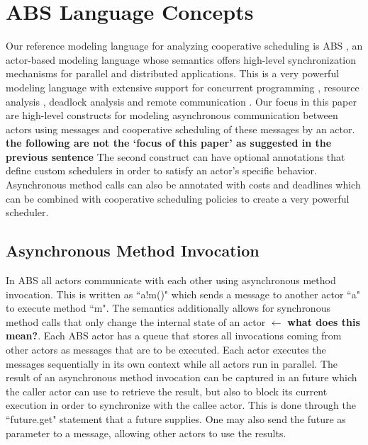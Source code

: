 

\section{ABS Language Concepts}
\label{lang}
Our reference modeling language for analyzing cooperative scheduling is ABS \cite{abs}, an actor-based modeling language whose semantics offers high-level synchronization mechanisms for parallel and  distributed applications. This is a very powerful modeling language with extensive support for concurrent programming \cite{cog}, resource analysis \cite{saco}, deadlock analysis \cite{dead} and remote communication \cite{dis,cloud}. Our focus in this paper are  high-level constructs for modeling asynchronous communication between actors using messages and cooperative scheduling of these messages by an actor.
{\bfseries the following are not the `focus of this paper' as suggested in the previous sentence}
The second construct can have optional annotations that define custom schedulers in order to satisfy an actor's specific behavior. Asynchronous method calls can also be annotated with costs and deadlines which can be combined with cooperative scheduling policies to create a very powerful scheduler.

\subsection{Asynchronous Method Invocation}\label{amc}
In ABS all actors communicate with each other using asynchronous method invocation.
This is written as ``a!m()" which sends a message to another actor ``a" to execute method ``m". 
The semantics additionally allows for synchronous method calls that only change the internal state of an actor $\leftarrow$ {\bfseries what does this mean?}. 
Each ABS actor has a queue that stores all invocations coming from other actors as messages that are to be executed. 
Each actor executes the messages sequentially in its own context while all actors run in parallel.  
The result of an asynchronous method invocation can be captured in an future which the caller actor can use to retrieve the result, but also to block its current execution in order to synchronize with the callee actor. 
This is done through the ``future.get" statement that a future supplies. %
One may also send the future as parameter to a message, allowing other actors to use the results.

